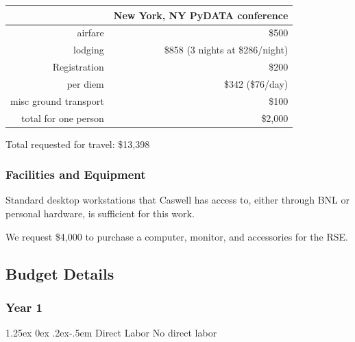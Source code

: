 \documentclass[12pt]{article}
\makeatletter
\numberwithin{page}{section}
\renewcommand{\paragraph}{%
  \@startsection{paragraph}{4}%
  {\z@}{1.25ex \@plus 0ex \@minus .2ex}{-.5em}%
  {\normalfont\normalsize\itshape\bfseries}%
}
\makeatother
\begin{document}
\begin{tabular}{|r|r|}
  \hline
  & New York, NY  PyDATA conference\\\hline
  airfare & \$500     \\\hline
  lodging & \$858 (3 nights at \$286/night)     \\\hline
  Registration & \$200     \\\hline
  per diem & \$342 (\$76/day)     \\\hline
  misc ground transport & \$100     \\\hline\hline
  total for one person & \$2,000     \\\hline
\end{tabular}

Total requested for travel: \$13,398

\subsubsection{Facilities and Equipment}

Standard desktop workstations that Caswell has access to, either
through BNL or personal hardware, is sufficient for this work.

We request \$4,000 to purchase a computer, monitor, and accessories
for the RSE.

\subsection{Budget Details}
\subsubsection{Year 1}
\paragraph{Direct Labor}
No direct labor
\end{document}

